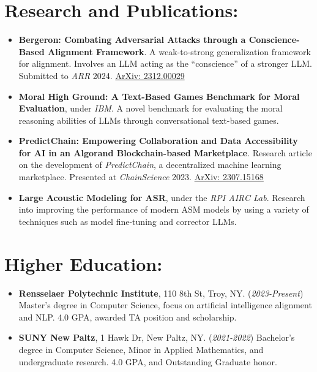 \documentclass[12pt]{article}
\begin{document}
\section*{Research and Publications:}
\begin{itemize}
    \itemsep0em
    
    \item \textbf{Bergeron: Combating Adversarial Attacks through a Conscience-Based Alignment Framework}.  A weak-to-strong generalization framework for alignment.  Involves an LLM acting as the ``conscience'' of a stronger LLM.  Submitted to \textit{ARR} 2024.  \href{https://arxiv.org/abs/2312.00029}{ArXiv: 2312.00029}
    
    \item \textbf{Moral High Ground: A Text-Based Games Benchmark for Moral Evaluation}, under \textit{IBM}.  A novel benchmark for evaluating the moral reasoning abilities of LLMs through conversational text-based games.
    
    \item \textbf{PredictChain: Empowering Collaboration and Data Accessibility for AI in an Algorand Blockchain-based Marketplace}.  Research article on the development of \textit{PredictChain}, a decentralized machine learning marketplace.  Presented at \textit{ChainScience} 2023. \href{https://arxiv.org/abs/2307.15168}{ArXiv: 2307.15168}
    
    \item \textbf{Large Acoustic Modeling for ASR}, under the \textit{RPI AIRC Lab}. Research into improving the performance of modern ASM models by using a variety of techniques such as model fine-tuning and corrector LLMs.
    
\end{itemize}

\section*{Higher Education:}
\begin{itemize}
    \itemsep0em
    \item \textbf{Rensselaer Polytechnic Institute}, 110 8th St, Troy, NY. (\textit{2023-Present}) Master's degree in Computer Science, focus on artificial intelligence alignment and NLP.  4.0 GPA, awarded TA position and scholarship.
    \item \textbf{SUNY New Paltz}, 1 Hawk Dr, New Paltz, NY. (\textit{2021-2022}) Bachelor's degree in Computer Science, Minor in Applied Mathematics, and undergraduate research. 4.0 GPA, and Outstanding Graduate honor.
\end{itemize}
\end{document}
